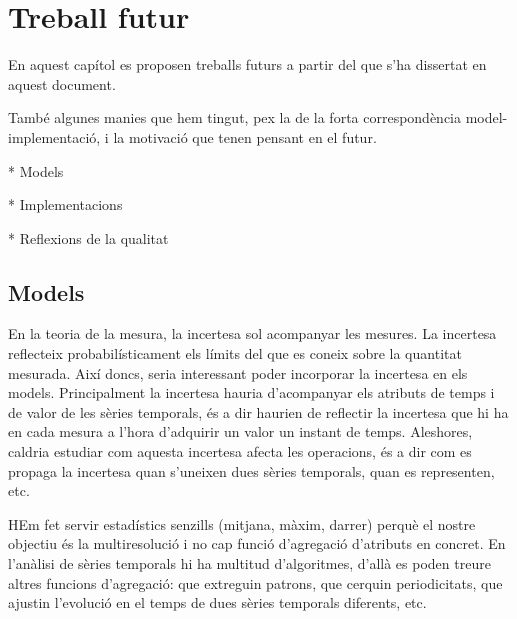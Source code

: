 \chapter{Treball futur}
\label{sec:futur}



En aquest capítol es proposen treballs futurs a partir del que s'ha  dissertat en aquest document.

També algunes manies que hem tingut, pex la de la forta correspondència model-implementació, i la motivació que tenen pensant en el futur.


* Models

* Implementacions

* Reflexions de la qualitat



\section{Models}


En la teoria de la mesura, la incertesa sol acompanyar les mesures. La
incertesa reflecteix probabilísticament els límits del que es coneix
sobre la quantitat mesurada.  Així doncs, seria interessant poder
incorporar la incertesa en els models.  Principalment la incertesa
hauria d'acompanyar els atributs de temps i de valor de les sèries
temporals, és a dir haurien de reflectir la incertesa que hi ha en
cada mesura a l'hora d'adquirir un valor un instant de temps.
Aleshores, caldria estudiar com aquesta incertesa afecta les
operacions, és a dir com es propaga la incertesa quan s'uneixen dues
sèries temporals, quan es representen, etc.




HEm fet servir estadístics senzills (mitjana, màxim, darrer) perquè el nostre objectiu és la multiresolució i no cap funció d'agregació d'atributs en concret. En l'anàlisi de sèries temporals hi ha multitud d'algoritmes, d'allà es poden treure altres funcions d'agregació: que extreguin patrons, que cerquin periodicitats, que ajustin l'evolució en el temps de dues sèries temporals diferents, etc.


